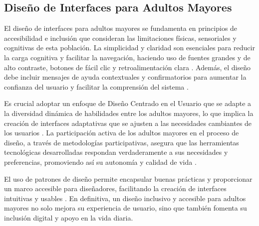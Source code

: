\subsection{Diseño de Interfaces para Adultos Mayores}

El diseño de interfaces para adultos mayores se fundamenta en principios de accesibilidad e inclusión que consideran las limitaciones físicas, sensoriales y cognitivas de esta población. La simplicidad y claridad son esenciales para reducir la carga cognitiva y facilitar la navegación, haciendo uso de fuentes grandes y de alto contraste, botones de fácil clic y retroalimentación clara \cite{wang_research_2020}. Además, el diseño debe incluir mensajes de ayuda contextuales y confirmatorios para aumentar la confianza del usuario y facilitar la comprensión del sistema \cite{zajicek_successful_2004}.

Es crucial adoptar un enfoque de Diseño Centrado en el Usuario que se adapte a la diversidad dinámica de habilidades entre los adultos mayores, lo que implica la creación de interfaces adaptativas que se ajusten a las necesidades cambiantes de los usuarios \cite{gregor_designing_2001}. La participación activa de los adultos mayores en el proceso de diseño, a través de metodologías participativas, asegura que las herramientas tecnológicas desarrolladas respondan verdaderamente a sus necesidades y preferencias, promoviendo así su autonomía y calidad de vida \cite{martin-hammond_engaging_2018}.

El uso de patrones de diseño permite encapsular buenas prácticas y proporcionar un marco accesible para diseñadores, facilitando la creación de interfaces intuitivas y usables \cite{zajicek_successful_2004}. En definitiva, un diseño inclusivo y accesible para adultos mayores no solo mejora su experiencia de usuario, sino que también fomenta su inclusión digital y apoyo en la vida diaria.

